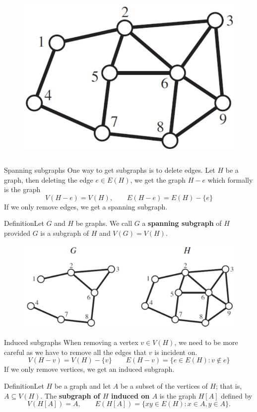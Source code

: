 \documentclass{beamer}
\def\bl[#1]#2{\begin{block}{#1}#2\end{block}}
\begin{document}
\begin{frame}
\begin{columns}
\begin{figure}
\includegraphics[scale=0.3]{subgraphexample2.pdf}
\end{figure}
\end{columns}
\end{frame}

\begin{frame}{Spanning subgraphs}
One way to get subgraphs is to delete edges. Let $H$ be a graph, then deleting the edge $e\in E(H)$, we get the graph $H-e$ which formally is the graph
\[
V(H-e)=V(H),\qquad E(H-e)=E(H)-\{e\}
\]
If we only remove edges, we get a spanning subgraph.
\bl[Definition]{Let $G$ and $H$ be graphs. We call $G$ a \textbf{spanning subgraph} of $H$ provided $G$ is a subgraph of $H$ and $V(G)=V(H)$.}\vspace{-0.2cm}
\begin{figure}
\centering
\includegraphics[scale=0.4]{SpanningSubgraph.pdf}
\end{figure}
\end{frame}

\begin{frame}{Induced subgraphs}
When removing a vertex $v\in V(H)$, we need to be more careful as we have to remove all the edges that $v$ is incident on.
\[
V(H-v)=V(H)-\{v\}\qquad E(H-v)=\{e\in E(H): v\notin e\}
\]
If we only remove vertices, we get an induced subgraph.
\bl[Definition]{Let $H$ be a graph and let $A$ be a subset of the vertices of $H$; that is, $A\subseteq V(H)$. The \textbf{subgraph of $H$ induced on $A$} is the graph $H[A]$ defined by
\[
V(H[A])=A,\qquad E(H[A])=\{xy\in E(H): x\in A, y\in A\}.
\]}
\end{frame}
\end{document}

